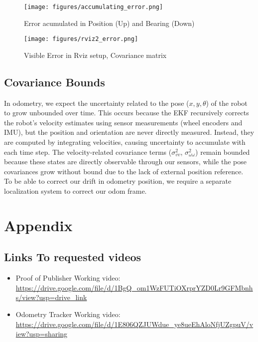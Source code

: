 \documentclass[14pt,letterpaper]{article}
\begin{document}
\begin{figure}[H]
\centering
\texttt{[image: figures/accumulating\_error.png]}
\caption{Error acumulated in Position (Up) and Bearing (Down)}
\label{fig:accumulating_error}
\end{figure}

\begin{figure}[H]
\centering
\texttt{[image: figures/rviz2\_error.png]}
\caption{Visible Error in Rviz setup, Covariance matrix}
\label{fig:rviz erro}
\end{figure}

\subsection{Covariance Bounds}

In odometry, we expect the uncertainty related to the pose ($x, y, \theta$) of the robot to grow unbounded over time. This occurs because the EKF
recursively corrects the robot's velocity estimates using sensor measurements (wheel encoders and IMU), but the position and orientation are never directly
measured. Instead, they are computed by integrating velocities, causing uncertainty to accumulate with each time step. The velocity-related covariance
terms ($\sigma^2_{vv}$, $\sigma^2_{\omega\omega}$) remain bounded because these states are directly observable through our sensors, while the pose
covariances grow without bound due to the lack of external position reference.
\\

To be able to correct our drift in odometry position, we require a separate localization system to correct our odom frame.

\newpage

\section{Appendix}
\subsection{Links To requested videos}
\begin{itemize}
  \item Proof of Publisher Working video: \url{https://drive.google.com/file/d/1BgQ_om1WzFUTiOXrprYZD0Lr9GFMbnhs/view?usp=drive_link}
  \item Odometry Tracker Working video: \url{https://drive.google.com/file/d/1E806QZJUWdue_ye8ueEhAloNfjUZgpuV/view?usp=sharing}
\end{itemize}
\end{document}
